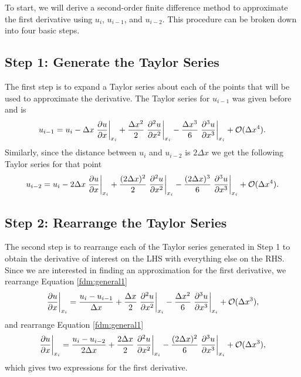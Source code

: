 To start, we will derive a second-order finite difference method to approximate the first derivative using $u_i$, $u_{i-1}$, and $u_{i-2}$. This procedure can be broken down into four basic steps.

\subsection{Step 1: Generate the Taylor Series}
The first step is to expand a Taylor series about each of the points that will be used to approximate the derivative. The Taylor series for $u_{i-1}$ was given before and is
\begin{equation}
	u_{i-1} = u_i - \Delta x \left.\frac{\partial u}{\partial x}\right\rvert_{x_i}^{} + \frac{\Delta x^2}{2} \left.\frac{\partial^2 u}{\partial x^2}\right\rvert_{x_i}^{} - \frac{\Delta x^3}{6} \left.\frac{\partial^3 u}{\partial x^3}\right\rvert_{x_i}^{} + \mathcal{O}(\Delta x^4).
	\label{fdm:general1}
\end{equation}
Similarly, since the distance between $u_i$ and $u_{i-2}$ is $2 \Delta x$ we get the following Taylor series for that point
\begin{equation}
	u_{i-2} = u_i - 2 \Delta x \left.\frac{\partial u}{\partial x}\right\rvert_{x_i}^{} + \frac{(2\Delta x)^2}{2} \left.\frac{\partial^2 u}{\partial x^2}\right\rvert_{x_i}^{} - \frac{(2\Delta x)^3}{6} \left.\frac{\partial^3 u}{\partial x^3}\right\rvert_{x_i}^{} + \mathcal{O}(\Delta x^4).
	\label{fdm:general2}
\end{equation}

\subsection{Step 2: Rearrange the Taylor Series}
The second step is to rearrange each of the Taylor series generated in Step 1 to obtain the derivative of interest on the LHS with everything else on the RHS. Since we are interested in finding an approximation for the first derivative, we rearrange Equation \ref{fdm:general1}
\begin{equation}
	\left.\frac{\partial u}{\partial x}\right\rvert_{x_i}^{} = \frac{u_i - u_{i-1}}{\Delta x} + \frac{\Delta x}{2}\left.\frac{\partial^2 u}{\partial x^2}\right\rvert_{x_i}^{} - \frac{\Delta x^2}{6}\left.\frac{\partial^3 u}{\partial x^3}\right\rvert_{x_i}^{} + \mathcal{O}(\Delta x^3),
	\label{eqn:aHK8G4M7}
\end{equation}
and rearrange Equation \ref{fdm:general1}
\begin{equation}
	\left.\frac{\partial u}{\partial x}\right\rvert_{x_i}^{} = \frac{u_i - u_{i-2}}{2\Delta x} + \frac{2\Delta x}{2}\left.\frac{\partial^2 u}{\partial x^2}\right\rvert_{x_i}^{} - \frac{(2\Delta x)^2}{6}\left.\frac{\partial^3 u}{\partial x^3}\right\rvert_{x_i}^{} + \mathcal{O}(\Delta x^3),
	\label{eqn:6sbrhgAM}
\end{equation}
which gives two expressions for the first derivative.

